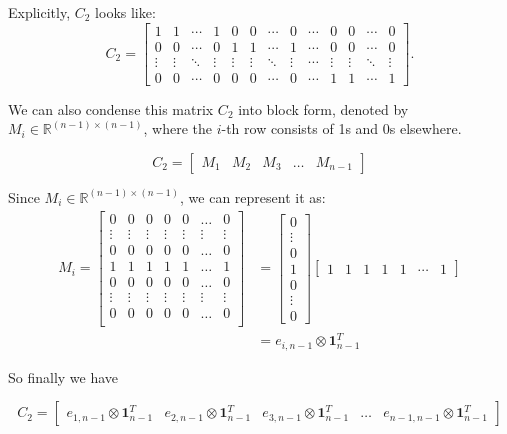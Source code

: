 Explicitly, \( C_2 \) looks like:
\[
C_2 = 
\begin{bmatrix}
1 & 1 & \cdots & 1 & 0 & 0 & \cdots & 0 & \cdots & 0 & 0 & \cdots & 0 \\
0 & 0 & \cdots & 0 & 1 & 1 & \cdots & 1 & \cdots & 0 & 0 & \cdots & 0 \\
\vdots & \vdots & \ddots & \vdots & \vdots & \vdots & \ddots & \vdots & \cdots & \vdots & \vdots & \ddots & \vdots \\
0 & 0 & \cdots & 0 & 0 & 0 & \cdots & 0 & \cdots & 1 & 1 & \cdots & 1
\end{bmatrix}.
\]

We can also condense this matrix $C_2$ into block form, denoted by $M_i\in\mathbb{R}^{(n-1)\times(n-1)}$, where the $i$-th row consists of 1s and 0s elsewhere.

\[
C_2 = 
\begin{bmatrix}
    M_1 & M_2 & M_3 &\dots& M_{n-1}
\end{bmatrix}
\]

Since $M_i\in\mathbb{R}^{(n-1)\times(n-1)}$, we can represent it as:
\begin{align*}
    M_i = 
    \begin{bmatrix}
    0&0&0&0&0&\dots&0\\
    \vdots&\vdots&\vdots&\vdots&\vdots&\vdots&\vdots\\
    0&0&0&0&0&\dots&0\\
    1&1&1&1&1&\dots&1\\
    0&0&0&0&0&\dots&0\\
    \vdots&\vdots&\vdots&\vdots&\vdots&\vdots&\vdots\\
    0&0&0&0&0&\dots&0\\
    \end{bmatrix} &= 
    \begin{bmatrix}
    0\\\vdots\\0\\1\\0\\\vdots\\0
    \end{bmatrix}
    \begin{bmatrix}
    1&1&1&1&1&\cdots&1
    \end{bmatrix} \\
    &= e_{i,n-1} \otimes \mathbf{1}_{n-1}^T
\end{align*}

So finally we have 

\[
C_2 = 
\begin{bmatrix}
    e_{1,n-1} \otimes \mathbf{1}_{n-1}^T & e_{2,n-1} \otimes \mathbf{1}_{n-1}^T& e_{3,n-1} \otimes \mathbf{1}_{n-1}^T & \dots & e_{n-1,n-1} \otimes \mathbf{1}_{n-1}^T
\end{bmatrix}
\]


